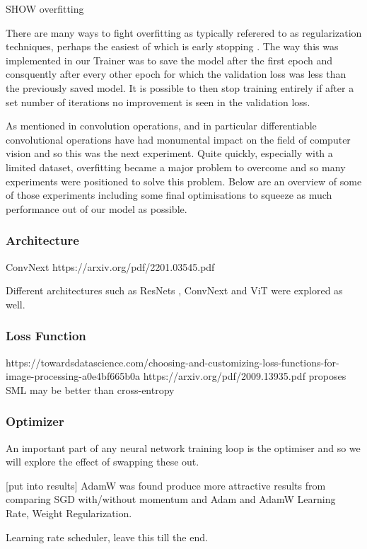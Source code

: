 SHOW overfitting

There are many ways to fight overfitting as typically referered to as regularization techniques, perhaps the easiest of which is early stopping \cite{}.
The way this was implemented in our Trainer was to save the model after the first epoch and consquently after every other epoch for which the validation 
loss was less than the previously saved model.  It is possible to then stop training entirely if after a set number of iterations no improvement is seen 
in the validation loss.

As mentioned in  convolution operations, and in particular differentiable convolutional operations have had monumental 
impact on the field of computer vision and so this was the next experiment. Quite quickly, especially with a limited dataset, overfitting 
became a major problem to overcome and so many experiments were positioned to solve this problem.  Below are an overview of some of those 
experiments including some final optimisations to squeeze as much performance out of our model as possible.


\subsubsection{Architecture}
ConvNext https://arxiv.org/pdf/2201.03545.pdf

Different architectures such as ResNets \cite{}, ConvNext \cite{} and ViT were explored as well.

\subsubsection{Loss Function}
https://towardsdatascience.com/choosing-and-customizing-loss-functions-for-image-processing-a0e4bf665b0a
https://arxiv.org/pdf/2009.13935.pdf proposes SML may be better than cross-entropy

\subsubsection{Optimizer}
An important part of any neural network training loop is the optimiser and so we will explore the effect of swapping these out.

[put into results]
AdamW was found produce more attractive results from comparing SGD with/without momentum and Adam and AdamW \cite{}
Learning Rate, Weight Regularization.

Learning rate scheduler, leave this till the end.

